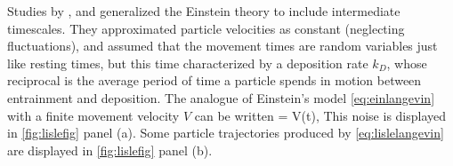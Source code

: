 Studies by \citet{Lisle1998}, and \citet{Lajeunesse2017} generalized the Einstein theory to include intermediate timescales. They approximated particle velocities as constant (neglecting fluctuations), and \DIFaddbegin {}\DIFaddend assumed that the movement times are \DIFdelbegin {}\DIFdelend \DIFaddbegin {}\DIFaddend random variables just like resting times, but this time characterized by a deposition rate $k_D$, whose reciprocal is the average period of time a particle spends in motion between entrainment and deposition.
The analogue of Einstein's model \DIFdelbegin {}\DIFdelend \DIFaddbegin {}\DIFaddend \ref{eq:einlangevin} with a finite movement velocity $V$ can be written
\be {} = V\eta(t), \label{eq:lislelangevin}\ee
\DIFaddbegin {}\DIFaddend This noise is displayed in \DIFdelbegin {}\DIFdelend \DIFaddbegin {}\DIFaddend \ref{fig:lislefig} panel (a). Some particle trajectories produced by \DIFdelbegin {}\DIFdelend \DIFaddbegin {}\DIFaddend \ref{eq:lislelangevin} are displayed in \DIFdelbegin {}\DIFdelend \DIFaddbegin {}\DIFaddend \ref{fig:lislefig} panel (b).

